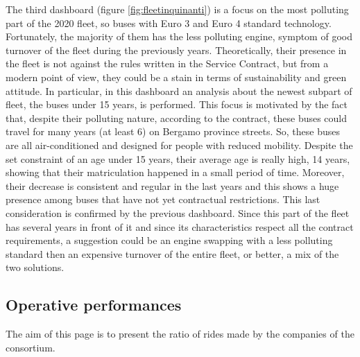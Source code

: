 The third dashboard (figure \ref{fig:fleetinquinanti}) is a focus on the most polluting part of the 2020 fleet, so buses with Euro 3 and Euro 4 standard technology. Fortunately, the majority of them has the less polluting engine, symptom of good turnover of the fleet during the previously years. Theoretically, their presence in the fleet is not against the rules written in the Service Contract, but from a modern point of view, they could be a stain in terms of sustainability and green attitude. In particular, in this dashboard an analysis about the newest subpart of fleet, the buses under 15 years, is performed. This focus is motivated by the fact that, despite their polluting nature, according to the contract, these buses could travel for many years (at least 6) on Bergamo province streets. So, these buses are all air-conditioned and designed for people with reduced mobility. Despite the set constraint of an age under 15 years, their average age is really high, 14 years, showing that their matriculation happened in a small period of time. Moreover, their decrease is consistent and regular in the last years and this shows a huge presence among buses that have not yet contractual restrictions. This last consideration is confirmed by the previous dashboard. Since this part of the fleet has several years in front of it and since its characteristics respect all the contract requirements, a suggestion could be an engine swapping with a less polluting standard then an expensive turnover of the entire fleet, or better, a mix of the two solutions.
\newpage
\begin{landscape}
\thispagestyle{empty}

\end{landscape}
\newpage


\newpage
\begin{landscape}
\thispagestyle{empty}

\end{landscape}
\newpage

\subsection{Operative performances}
The aim of this page is to present the ratio of rides made by the companies of the consortium. 


